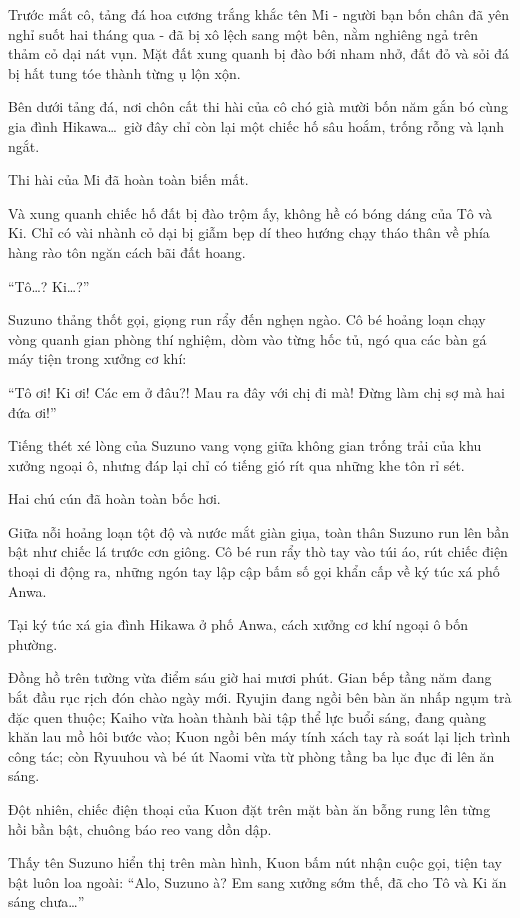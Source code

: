 \documentclass[../main.tex]{subfiles}
\begin{document}
Trước mắt cô, tảng đá hoa cương trắng khắc tên Mi - người bạn bốn chân đã yên nghỉ suốt hai tháng qua - đã bị xô lệch sang một bên, nằm nghiêng ngả trên thảm cỏ dại nát vụn. Mặt đất xung quanh bị đào bới nham nhở, đất đỏ và sỏi đá bị hất tung tóe thành từng ụ lộn xộn.

Bên dưới tảng đá, nơi chôn cất thi hài của cô chó già mười bốn năm gắn bó cùng gia đình Hikawa\dots\ giờ đây chỉ còn lại một chiếc hố sâu hoắm, trống rỗng và lạnh ngắt.

Thi hài của Mi đã hoàn toàn biến mất.

Và xung quanh chiếc hố đất bị đào trộm ấy, không hề có bóng dáng của Tô và Ki. Chỉ có vài nhành cỏ dại bị giẫm bẹp dí theo hướng chạy tháo thân về phía hàng rào tôn ngăn cách bãi đất hoang.

``Tô\dots? Ki\dots?''

Suzuno thảng thốt gọi, giọng run rẩy đến nghẹn ngào. Cô bé hoảng loạn chạy vòng quanh gian phòng thí nghiệm, dòm vào từng hốc tủ, ngó qua các bàn gá máy tiện trong xưởng cơ khí:

``Tô ơi! Ki ơi! Các em ở đâu?! Mau ra đây với chị đi mà! Đừng làm chị sợ mà hai đứa ơi!''

Tiếng thét xé lòng của Suzuno vang vọng giữa không gian trống trải của khu xưởng ngoại ô, nhưng đáp lại chỉ có tiếng gió rít qua những khe tôn rỉ sét.

Hai chú cún đã hoàn toàn bốc hơi.

Giữa nỗi hoảng loạn tột độ và nước mắt giàn giụa, toàn thân Suzuno run lên bần bật như chiếc lá trước cơn giông. Cô bé run rẩy thò tay vào túi áo, rút chiếc điện thoại di động ra, những ngón tay lập cập bấm số gọi khẩn cấp về ký túc xá phố Anwa.

\ct

Tại ký túc xá gia đình Hikawa ở phố Anwa, cách xưởng cơ khí ngoại ô bốn phường.

Đồng hồ trên tường vừa điểm sáu giờ hai mươi phút. Gian bếp tầng năm đang bắt đầu rục rịch đón chào ngày mới. Ryujin đang ngồi bên bàn ăn nhấp ngụm trà đặc quen thuộc; Kaiho vừa hoàn thành bài tập thể lực buổi sáng, đang quàng khăn lau mồ hôi bước vào; Kuon ngồi bên máy tính xách tay rà soát lại lịch trình công tác; còn Ryuuhou và bé út Naomi vừa từ phòng tầng ba lục đục đi lên ăn sáng.

Đột nhiên, chiếc điện thoại của Kuon đặt trên mặt bàn ăn bỗng rung lên từng hồi bần bật, chuông báo reo vang dồn dập.

Thấy tên Suzuno hiển thị trên màn hình, Kuon bấm nút nhận cuộc gọi, tiện tay bật luôn loa ngoài: ``Alo, Suzuno à? Em sang xưởng sớm thế, đã cho Tô và Ki ăn sáng chưa\dots''
\end{document}
